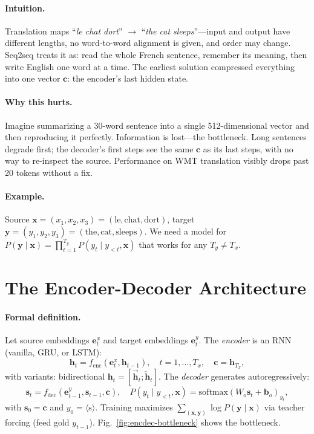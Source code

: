 \paragraph{Intuition.} Translation maps ``\emph{le chat dort}'' $\to$ ``\emph{the cat sleeps}''---input and output have different lengths, no word-to-word alignment is given, and order may change. Seq2seq treats it as: read the whole French sentence, remember its meaning, then write English one word at a time. The earliest solution compressed everything into one vector $\mathbf{c}$: the encoder's last hidden state.

\paragraph{Why this hurts.} Imagine summarizing a 30-word sentence into a single 512-dimensional vector and then reproducing it perfectly. Information is lost---the bottleneck. Long sentences degrade first; the decoder's first steps see the same $\mathbf{c}$ as its last steps, with no way to re-inspect the source. Performance on WMT translation visibly drops past 20 tokens without a fix.

\paragraph{Example.} Source $\mathbf{x}=(x_1,x_2,x_3)=(\text{le},\text{chat},\text{dort})$, target $\mathbf{y}=(y_1,y_2,y_3)=(\text{the},\text{cat},\text{sleeps})$. We need a model for $P(\mathbf{y}\mid\mathbf{x})=\prod_{t=1}^{T_y} P(y_t\mid y_{<t},\mathbf{x})$ that works for any $T_y\neq T_x$.

\section{The Encoder-Decoder Architecture}
\label{sec:encdec}
\paragraph{Formal definition.} Let source embeddings $\mathbf{e}^x_t$ and target embeddings $\mathbf{e}^y_t$. The \emph{encoder} is an RNN (vanilla, GRU, or LSTM):
\begin{equation}
\mathbf{h}_t = f_{\text{enc}}(\mathbf{e}^x_t, \mathbf{h}_{t-1}),\quad t=1,\dots,T_x,\quad \mathbf{c}=\mathbf{h}_{T_x},
\label{eq:encoder}
\end{equation}
with variants: bidirectional $\mathbf{h}_t=[\overrightarrow{\mathbf{h}}_t;\overleftarrow{\mathbf{h}}_t]$. The \emph{decoder} generates autoregressively:
\begin{equation}
\mathbf{s}_t = f_{\text{dec}}(\mathbf{e}^y_{t-1}, \mathbf{s}_{t-1}, \mathbf{c}),\quad P(y_t\mid y_{<t},\mathbf{x})=\mathrm{softmax}(W_o\mathbf{s}_t+\mathbf{b}_o)_{y_t},
\label{eq:decoder}
\end{equation}
with $\mathbf{s}_0=\mathbf{c}$ and $y_0=\langle\text{s}\rangle$. Training maximizes $\sum_{(\mathbf{x},\mathbf{y})}\log P(\mathbf{y}\mid\mathbf{x})$ via teacher forcing (feed gold $y_{t-1}$). Fig.~\ref{fig:encdec-bottleneck} shows the bottleneck.

